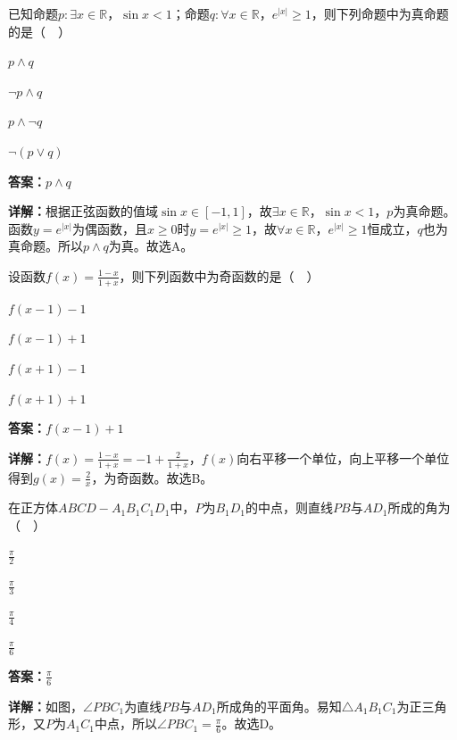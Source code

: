 \begin{question}[points=5]
已知命题$p:\exists x\in\mathbb{R}$，$\sin x<1$；命题$q:\forall x\in\mathbb{R}$，$e^{|x|}\geq 1$，则下列命题中为真命题的是（  ）
\begin{choices}
  \item $p\land q$
  \item $\lnot p\land q$
  \item $p\land \lnot q$
  \item $\lnot(p\lor q)$
\end{choices}
\begin{solution}
\textbf{答案：}$p\land q$

\textbf{详解：}根据正弦函数的值域$\sin x\in[-1,1]$，故$\exists x\in\mathbb{R}$，$\sin x<1$，$p$为真命题。函数$y=e^{|x|}$为偶函数，且$x\geq 0$时$y=e^{|x|}\geq 1$，故$\forall x\in\mathbb{R}$，$e^{|x|}\geq 1$恒成立，$q$也为真命题。所以$p\land q$为真。故选A。
\end{solution}
\end{question}

\begin{question}[points=5]
设函数$f(x)=\frac{1-x}{1+x}$，则下列函数中为奇函数的是（  ）
\begin{choices}
  \item $f(x-1)-1$
  \item $f(x-1)+1$
  \item $f(x+1)-1$
  \item $f(x+1)+1$
\end{choices}
\begin{solution}
\textbf{答案：}$f(x-1)+1$

\textbf{详解：}$f(x)=\frac{1-x}{1+x}=-1+\frac{2}{1+x}$，$f(x)$向右平移一个单位，向上平移一个单位得到$g(x)=\frac{2}{x}$，为奇函数。故选B。
\end{solution}
\end{question}

\begin{question}[points=5]
在正方体$ABCD-A_1B_1C_1D_1$中，$P$为$B_1D_1$的中点，则直线$PB$与$AD_1$所成的角为（  ）
\begin{choices}
  \item $\frac{\pi}{2}$
  \item $\frac{\pi}{3}$
  \item $\frac{\pi}{4}$
  \item $\frac{\pi}{6}$
\end{choices}
\begin{solution}
\textbf{答案：}$\frac{\pi}{6}$

\textbf{详解：}如图，$\angle PBC_1$为直线$PB$与$AD_1$所成角的平面角。易知$\triangle A_1B_1C_1$为正三角形，又$P$为$A_1C_1$中点，所以$\angle PBC_1=\frac{\pi}{6}$。故选D。
\end{solution}
\end{question}

